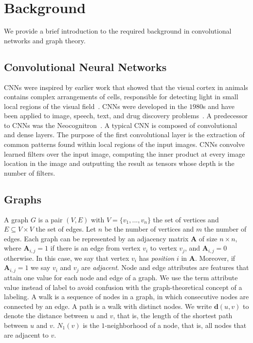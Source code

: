 \documentclass{article}
\begin{document}
\section{Background}
We provide a brief introduction to the required background in convolutional networks and graph theory.
\subsection{Convolutional Neural Networks}

CNNs were inspired by earlier work that showed that the visual cortex in animals contains complex arrangements of cells, responsible for detecting light in small local regions of the visual field~\cite{hubel:1968}. CNNs were developed in the $1980$s and have been  applied to image, speech, text, and drug discovery problems~\cite{atlas:1987,LeCun:1989,lecun:1998,lecun:2015,WallachDH:2015}. A predecessor to CNNs was the Neocognitron~\cite{Kunihiko:1980}. A typical CNN is composed of convolutional and dense layers. The purpose of the first convolutional layer is the extraction of common patterns found within local regions of the input images. CNNs convolve learned filters over the input image, computing the inner product at every image location
in the image and outputting the result as tensors whose depth is the number of filters.

\subsection{Graphs}

A graph $G$ is a pair $(V, E)$ with $V = \{v_1, ..., v_n\}$ the set of vertices and $E \subseteq V \times V$ the set of edges. Let $n$ be the number of vertices and $m$ the number of edges. Each graph can be represented by an adjacency matrix $\mathbf{A}$ of size $n \times n$, where $\mathbf{A}_{i,j} = 1$ if there is an edge from vertex $v_i$ to vertex 
$v_j$, and $\mathbf{A}_{i,j} = 0$ otherwise. In this case, we say that vertex $v_i$ has \emph{position} $i$ in $\mathbf{A}$. Moreover, if $\mathbf{A}_{i,j} = 1$ we say $v_i$ and $v_j$ are \emph{adjacent}. Node and edge attributes are features that attain one value for each node and edge of a graph. We use the term attribute value instead of label to avoid confusion with the graph-theoretical concept of a labeling. 
A walk is a sequence of nodes in a graph, in which consecutive nodes are connected by an edge. A path is a walk with distinct nodes.
We write $\mathbf{d}(u, v)$ to denote the distance between $u$ and $v$, that is, the length of the shortest path between $u$ and $v$.
$N_1(v)$ is the $1$-neighborhood of a node, that is, all nodes that are adjacent to $v$. 
\end{document}

